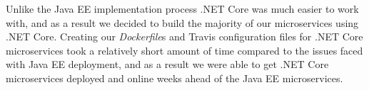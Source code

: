 Unlike the Java EE implementation process .NET Core was much easier to work with, and as a result we decided to build the majority of our microservices using .NET Core. Creating our \textit{Dockerfile}s and Travis configuration files for .NET Core microservices took a relatively short amount of time compared to the issues faced with Java EE deployment, and as a result we were able to get .NET Core microservices deployed and online weeks ahead of the Java EE microservices.
